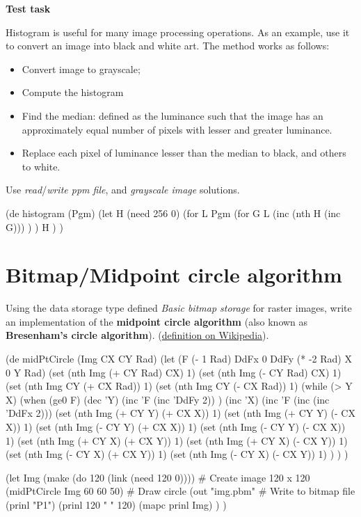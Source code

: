 \textbf{Test task}

Histogram is useful for many image processing operations. As an example,
use it to convert an image into black and white art. The method works as
follows:

\begin{itemize}
\item
  Convert image to grayscale;
\item
  Compute the histogram
\item
  Find the median: defined as the luminance such that the image has an
  approximately equal number of pixels with lesser and greater
  luminance.
\item
  Replace each pixel of luminance lesser than the median to black, and
  others to white.
\end{itemize}

Use \emph{read}/\emph{write ppm file}, and \emph{grayscale image}
solutions.


\begin{wideverbatim}



(de histogram (Pgm)
   (let H (need 256 0)
      (for L Pgm
         (for G L
            (inc (nth H (inc G))) ) )
      H ) )

\end{wideverbatim}

\pagebreak{}
\section*{Bitmap/Midpoint circle algorithm}

Using the data storage type defined \emph{Basic bitmap storage} for
raster images, write an implementation of the \textbf{midpoint circle
  algorithm} (also known as \textbf{Bresenham's circle algorithm}).
(\href{http://en.wikipedia.org/wiki/Midpoint\_circle\_algorithm}{definition
  on Wikipedia}).


\begin{wideverbatim}

(de midPtCircle (Img CX CY Rad)
   (let (F (- 1 Rad)  DdFx 0  DdFy (* -2 Rad)  X 0  Y Rad)
      (set (nth Img (+ CY Rad) CX) 1)
      (set (nth Img (- CY Rad) CX) 1)
      (set (nth Img CY (+ CX Rad)) 1)
      (set (nth Img CY (- CX Rad)) 1)
      (while (> Y X)
         (when (ge0 F)
            (dec 'Y)
            (inc 'F (inc 'DdFy 2)) )
         (inc 'X)
         (inc 'F (inc (inc 'DdFx 2)))
         (set (nth Img (+ CY Y) (+ CX X)) 1)
         (set (nth Img (+ CY Y) (- CX X)) 1)
         (set (nth Img (- CY Y) (+ CX X)) 1)
         (set (nth Img (- CY Y) (- CX X)) 1)
         (set (nth Img (+ CY X) (+ CX Y)) 1)
         (set (nth Img (+ CY X) (- CX Y)) 1)
         (set (nth Img (- CY X) (+ CX Y)) 1)
         (set (nth Img (- CY X) (- CX Y)) 1) ) ) )

(let Img (make (do 120 (link (need 120 0))))       # Create image 120 x 120
   (midPtCircle Img 60 60 50)                      # Draw circle
   (out "img.pbm"                                  # Write to bitmap file
      (prinl "P1")
      (prinl 120 " " 120)
      (mapc prinl Img) ) )

\end{wideverbatim}


